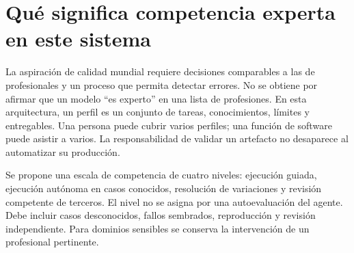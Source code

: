 \def\paperRoman{V}


\begin{abstract}
Se propone una organización de investigación y producción que convierte los cuatro manuscritos anteriores en entregables verificables. Se identifican 56 perfiles que cubren ciencia, ingeniería, marca, dirección, producción, postproducción, sonido, accesibilidad y evaluación. Cada perfil se define por responsabilidad, artefacto y criterio de revisión. La competencia se verifica mediante casos, reproducción y evaluación independiente, en lugar de declararse por adopción de un rol. El protocolo compara el sistema propuesto con alternativas clásicas y producción profesional bajo recursos equivalentes; separa calidad percibida, exactitud de producto y coste operacional. Se presentan los controles algebraicos ejecutados, la evidencia heredada del prototipo y un diseño de estudio con asignación aleatoria y análisis jerárquico. Se especifican hitos, contratos, causas de rechazo y un piloto de running. La contribución central es una ruta para transformar propiedad intelectual y capacidades de software en películas auditables, con criterios explícitos para avanzar, revisar o descartar una técnica.
\end{abstract}

\section{Qué significa competencia experta en este sistema}
La aspiración de calidad mundial requiere decisiones comparables a las de profesionales y un proceso que permita detectar errores. No se obtiene por afirmar que un modelo ``es experto'' en una lista de profesiones. En esta arquitectura, un perfil es un conjunto de tareas, conocimientos, límites y entregables. Una persona puede cubrir varios perfiles; una función de software puede asistir a varios. La responsabilidad de validar un artefacto no desaparece al automatizar su producción.

Se propone una escala de competencia de cuatro niveles: ejecución guiada, ejecución autónoma en casos conocidos, resolución de variaciones y revisión competente de terceros. El nivel no se asigna por una autoevaluación del agente. Debe incluir casos desconocidos, fallos sembrados, reproducción y revisión independiente. Para dominios sensibles se conserva la intervención de un profesional pertinente.

